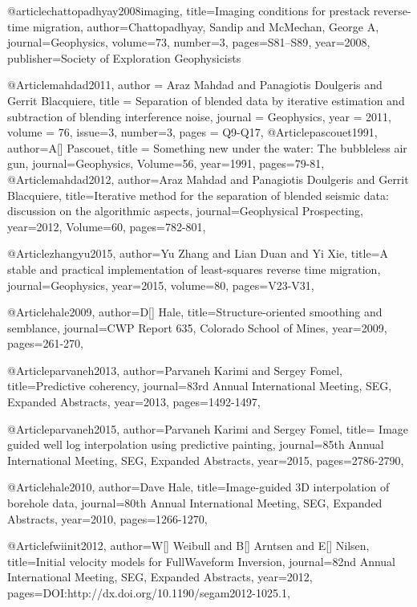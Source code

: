 {@article{chattopadhyay2008imaging,
  title={Imaging conditions for prestack reverse-time migration},
  author={Chattopadhyay, Sandip and McMechan, George A},
  journal={Geophysics},
  volume={73},
  number={3},
  pages={S81--S89},
  year={2008},
  publisher={Society of Exploration Geophysicists}
}

@Article{mahdad2011,
  author = 	 {Araz Mahdad and Panagiotis Doulgeris and Gerrit Blacquiere},
  title = 	 {Separation of blended data by iterative estimation and subtraction of blending interference noise},
  journal = 	 {Geophysics},
  year = 	 2011,
  volume =	 76,
  issue=3,
  number=3,
  pages =	 {Q9-Q17},
}
@Article{pascouet1991,
  author={A[] Pascouet},
  title = {Something new under the water: The bubbleless air gun},
  journal={Geophysics},
  Volume=56,
  year=1991,
  pages={79-81},
}
@Article{mahdad2012,
  author={Araz Mahdad and Panagiotis Doulgeris and Gerrit Blacquiere},
  title={Iterative method for the separation of blended seismic data: discussion on the algorithmic aspects},
  journal={Geophysical Prospecting},
  year=2012,
  Volume=60,
  pages={782-801},
}



@Article{zhangyu2015,
  author={Yu Zhang and Lian Duan and Yi Xie},
  title={A stable and practical implementation of least-squares reverse time migration},
  journal={Geophysics},
  year=2015,
  volume=80,
  pages={V23-V31},
}
	




@Article{hale2009,
  author={D[] Hale},
  title={Structure-oriented smoothing and semblance},
  journal={CWP Report 635, Colorado School of Mines},
  year=2009,
  pages={261-270},
}


@Article{parvaneh2013,
  author={Parvaneh Karimi and Sergey Fomel},
  title={Predictive coherency},
  journal={83rd Annual International Meeting, SEG, Expanded Abstracts},
  year=2013,
  pages={1492-1497},
}

@Article{parvaneh2015,
  author={Parvaneh Karimi and Sergey Fomel},
  title={	Image guided well log interpolation using predictive painting},
  journal={85th Annual International Meeting, SEG, Expanded Abstracts},
  year=2015,
  pages={2786-2790},
}

@Article{hale2010,
  author={Dave Hale},
  title={Image-guided 3{D} interpolation of borehole data},
  journal={80th Annual International Meeting, SEG, Expanded Abstracts},
  year=2010,
  pages={1266-1270},
}

@Article{fwiinit2012,
  author={W[] Weibull and B[] Arntsen and E[] Nilsen},
  title={Initial velocity models for FullWaveform Inversion},
  journal={82nd Annual International Meeting, SEG, Expanded Abstracts},
  year=2012,
  pages={DOI:http://dx.doi.org/10.1190/segam2012-1025.1},
}






}
